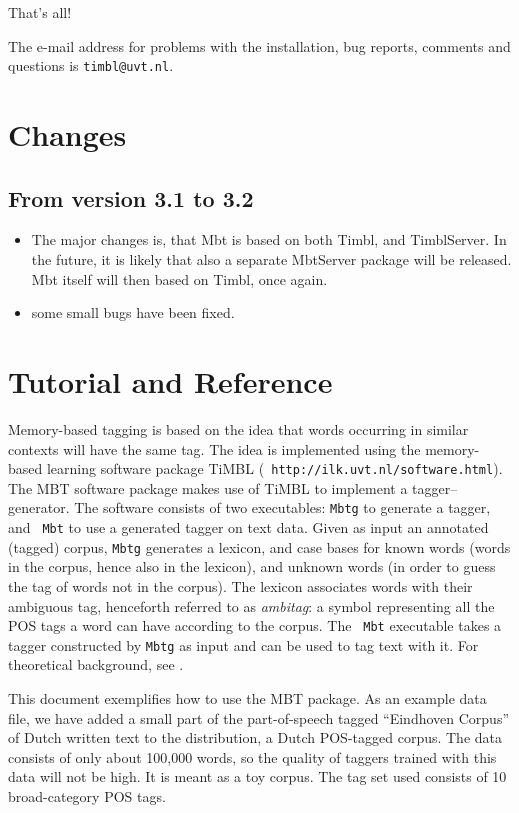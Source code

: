 \documentclass{report}
\begin{document}
That's all!

The e-mail address for problems with the installation, bug reports,
comments and questions is {\tt timbl@uvt.nl}.

\chapter{Changes}
\label{changes}
\section{From version 3.1 to 3.2}

\begin{itemize}
\item The major changes is, that Mbt is based on both Timbl, and TimblServer.
In the future, it is likely that also a separate MbtServer package will be released. Mbt itself will then based on Timbl, once again.
\item some small bugs have been fixed.

\end{itemize}

\chapter{Tutorial and Reference}
\label{tutorial}

Memory-based tagging is based on the idea that words occurring in
similar contexts will have the same tag. The idea is implemented using
the memory-based learning software package TiMBL ({\tt
  http://ilk.uvt.nl/software.html}).  The MBT software package
makes use of TiMBL to implement a tagger--generator.  The software
consists of two executables: {\tt Mbtg} to generate a tagger, and {\tt
  Mbt} to use a generated tagger on text data.  Given as input an
annotated (tagged) corpus, {\tt Mbtg} generates a lexicon, and case
bases for known words (words in the corpus, hence also in the
lexicon), and unknown words (in order to guess the tag of words
not in the corpus). The lexicon associates words with their ambiguous
tag, henceforth referred to as {\em ambitag}: a symbol representing
all the POS tags a word can have according to the corpus. The {\tt
  Mbt} executable takes a tagger constructed by {\tt Mbtg} as input
and can be used to tag text with it.  For theoretical background, see
\cite{Daelemans+96,Zavrel+99}.

This document exemplifies how to use the MBT package. As an example
data file, we have added a small part of the part-of-speech tagged
``Eindhoven Corpus'' of Dutch written text \cite{Uitdenboogaard75} to
the distribution, a Dutch POS-tagged corpus. The data consists of only
about 100,000 words, so the quality of taggers trained with this data
will not be high. It is meant as a toy corpus. The tag set used
consists of 10 broad-category POS tags.
\end{document}
